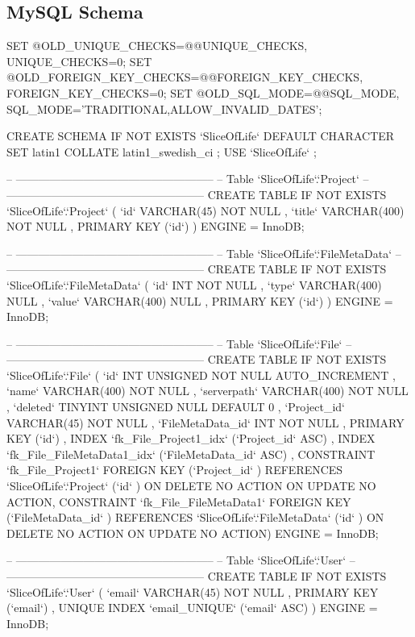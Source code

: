 \subsection{MySQL Schema}
\begin{spverbatim}
SET @OLD_UNIQUE_CHECKS=@@UNIQUE_CHECKS, UNIQUE_CHECKS=0;
SET @OLD_FOREIGN_KEY_CHECKS=@@FOREIGN_KEY_CHECKS, FOREIGN_KEY_CHECKS=0;
SET @OLD_SQL_MODE=@@SQL_MODE, SQL_MODE='TRADITIONAL,ALLOW_INVALID_DATES';

CREATE SCHEMA IF NOT EXISTS `SliceOfLife` DEFAULT CHARACTER SET latin1 COLLATE latin1_swedish_ci ;
USE `SliceOfLife` ;

-- -----------------------------------------------------
-- Table `SliceOfLife`.`Project`
-- -----------------------------------------------------
CREATE  TABLE IF NOT EXISTS `SliceOfLife`.`Project` (
  `id` VARCHAR(45) NOT NULL ,
  `title` VARCHAR(400) NOT NULL ,
  PRIMARY KEY (`id`) )
ENGINE = InnoDB;


-- -----------------------------------------------------
-- Table `SliceOfLife`.`FileMetaData`
-- -----------------------------------------------------
CREATE  TABLE IF NOT EXISTS `SliceOfLife`.`FileMetaData` (
  `id` INT NOT NULL ,
  `type` VARCHAR(400) NULL ,
  `value` VARCHAR(400) NULL ,
  PRIMARY KEY (`id`) )
ENGINE = InnoDB;


-- -----------------------------------------------------
-- Table `SliceOfLife`.`File`
-- -----------------------------------------------------
CREATE  TABLE IF NOT EXISTS `SliceOfLife`.`File` (
  `id` INT UNSIGNED NOT NULL AUTO_INCREMENT ,
  `name` VARCHAR(400) NOT NULL ,
  `serverpath` VARCHAR(400) NOT NULL ,
  `deleted` TINYINT UNSIGNED NULL DEFAULT 0 ,
  `Project_id` VARCHAR(45) NOT NULL ,
  `FileMetaData_id` INT NOT NULL ,
  PRIMARY KEY (`id`) ,
  INDEX `fk_File_Project1_idx` (`Project_id` ASC) ,
  INDEX `fk_File_FileMetaData1_idx` (`FileMetaData_id` ASC) ,
  CONSTRAINT `fk_File_Project1`
    FOREIGN KEY (`Project_id` )
    REFERENCES `SliceOfLife`.`Project` (`id` )
    ON DELETE NO ACTION
    ON UPDATE NO ACTION,
  CONSTRAINT `fk_File_FileMetaData1`
    FOREIGN KEY (`FileMetaData_id` )
    REFERENCES `SliceOfLife`.`FileMetaData` (`id` )
    ON DELETE NO ACTION
    ON UPDATE NO ACTION)
ENGINE = InnoDB;


-- -----------------------------------------------------
-- Table `SliceOfLife`.`User`
-- -----------------------------------------------------
CREATE  TABLE IF NOT EXISTS `SliceOfLife`.`User` (
  `email` VARCHAR(45) NOT NULL ,
  PRIMARY KEY (`email`) ,
  UNIQUE INDEX `email_UNIQUE` (`email` ASC) )
ENGINE = InnoDB;



\end{spverbatim}
